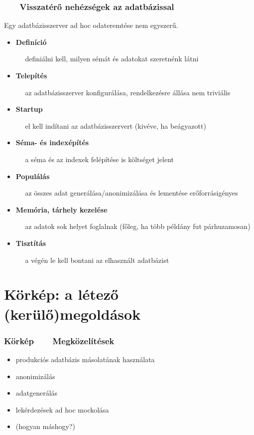 \documentclass[
]{beamer}
\newcommand{\slidetitle}[2]{\frametitle{{\small #1 ~ \ding{226} ~ } \normalsize \textbf{#2} }}
\begin{document}
\begin{frame}
    \slidetitle{\sectionshorttitle}{Visszatérő nehézségek az adatbázissal}

    Egy adatbázisszerver ad hoc odateremtése nem egyszerű. \par
    
    \vspace{0.5em}

    \begin{itemize}
        \pause \item \textbf{Definíció} \par
            { \small ~~ definiálni kell, milyen sémát és adatokat szeretnénk látni }
        \pause \item \textbf{Telepítés} \par
            { \small ~~ az adatbázisszerver konfigurálása, rendelkezésre állása nem triviális }
        \pause \item \textbf{Startup} \par
            { \small ~~ el kell indítani az adatbázisszervert (kivéve, ha beágyazott) }
        \pause \item \textbf{Séma- és indexépítés} \par
            { \small ~~ a séma és az indexek felépítése is költséget jelent }
        \pause \item \textbf{Populálás} \par
            { \small ~~ az összes adat generálása/anonimizálása és lementése erőforrásigényes }
        \pause \item \textbf{Memória, tárhely kezelése} \par
            { \small ~~ az adatok sok helyet foglalnak (főleg, ha több példány fut párhuzamosan) }
        \pause \item \textbf{Tisztítás} \par
            { \small ~~ a végén le kell bontani az elhasznált adatbázist }
    \end{itemize}
\end{frame}

\section{Körkép: a létező (kerülő)megoldások}
\def\sectionshorttitle{Körkép}

\begin{frame}
    \slidetitle{\sectionshorttitle}{Megközelítések}
    
    \begin{itemize}
        \setlength\itemsep{1em}
        \pause \item produkciós adatbázis másolatának használata
        \pause \item anonimizálás
        \pause \item adatgenerálás
        \pause \item lekérdezések ad hoc mockolása
        \pause \item (hogyan máshogy?)
    \end{itemize}
\end{frame}
\end{document}
